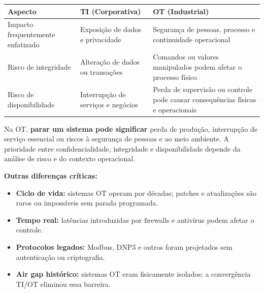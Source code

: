 \begin{longtable}[]{@{}
  >{\raggedright\arraybackslash}p{}
  >{\raggedright\arraybackslash}p{}
  >{\raggedright\arraybackslash}p{}@{}}
\toprule\noalign{}
\begin{minipage}[b]{\linewidth}\raggedright
Aspecto
\end{minipage} & \begin{minipage}[b]{\linewidth}\raggedright
TI (Corporativa)
\end{minipage} & \begin{minipage}[b]{\linewidth}\raggedright
OT (Industrial)
\end{minipage} \\
\midrule\noalign{}
\endhead
\bottomrule\noalign{}
\endlastfoot
Impacto frequentemente enfatizado & Exposição de dados e privacidade & Segurança de pessoas, processo e continuidade operacional \\
Risco de integridade & Alteração de dados ou transações & Comandos ou valores manipulados podem afetar o processo físico \\
Risco de disponibilidade & Interrupção de serviços e negócios & Perda de supervisão ou controle pode causar consequências físicas e operacionais \\
\end{longtable}

Na OT, \textbf{parar um sistema pode significar} perda de produção, interrupção de serviço essencial ou riscos à segurança de pessoas e ao meio ambiente. A prioridade entre confidencialidade, integridade e disponibilidade depende da análise de risco e do contexto operacional.

\textbf{Outras diferenças críticas:}

\begin{itemize}
\tightlist
\item
  \textbf{Ciclo de vida:} sistemas OT operam por décadas; patches e atualizações são raros ou impossíveis sem parada programada.
\item
  \textbf{Tempo real:} latências introduzidas por firewalls e antivírus podem afetar o controle.
\item
  \textbf{Protocolos legados:} Modbus, DNP3 e outros foram projetados sem autenticação ou criptografia.
\item
  \textbf{Air gap histórico:} sistemas OT eram fisicamente isolados; a convergência TI/OT eliminou essa barreira.
\end{itemize}

